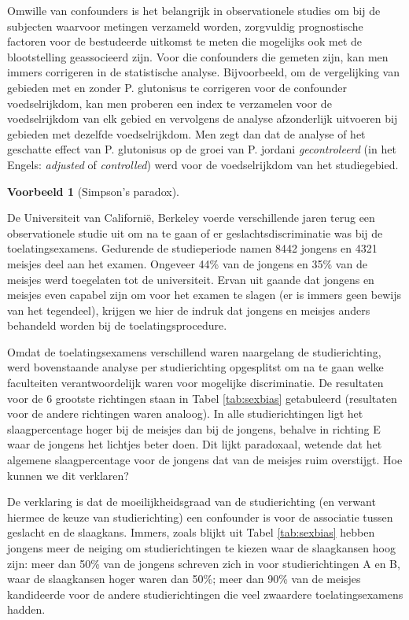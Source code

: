 \documentclass[
  12pt,dutch,coursenotes]{book}
\theoremstyle{definition}
\theoremstyle{definition}
\newtheorem{example}{Voorbeeld}[chapter]
\theoremstyle{definition}
\theoremstyle{remark}
\begin{document}
Omwille van confounders is het belangrijk in observationele studies om bij
de subjecten waarvoor metingen verzameld worden, zorgvuldig prognostische factoren voor de bestudeerde uitkomst te meten die mogelijks ook met de blootstelling geassocieerd zijn.
Voor die confounders die gemeten zijn, kan men immers corrigeren in de
statistische analyse. Bijvoorbeeld, om de vergelijking van gebieden met en
zonder P. glutonisus te corrigeren voor de confounder voedselrijkdom, kan men proberen een index te verzamelen voor de voedselrijkdom van elk gebied en vervolgens de analyse
afzonderlijk uitvoeren bij gebieden met dezelfde voedselrijkdom.
Men zegt dan dat de analyse of het geschatte
effect van P. glutonisus op de groei van P. jordani \emph{gecontroleerd} (in het Engels:
\emph{adjusted} of \emph{controlled}) werd voor de voedselrijkdom van het studiegebied.

\begin{example}[Simpson's paradox]
\protect\hypertarget{exm:unnamed-chunk-82}{}{\label{exm:unnamed-chunk-82} \iffalse (Simpson's paradox) \fi{} }
\end{example}

De Universiteit van
Californië, Berkeley voerde verschillende jaren terug een observationele
studie uit om na te gaan of er geslachtsdiscriminatie was bij de
toelatingsexamens. Gedurende de studieperiode namen 8442 jongens en 4321
meisjes deel aan het examen. Ongeveer 44\% van de jongens en 35\% van de
meisjes werd toegelaten tot de universiteit. Ervan uit gaande dat jongens en
meisjes even capabel zijn om voor het examen te slagen (er is immers geen
bewijs van het tegendeel), krijgen we hier de indruk dat jongens en meisjes
anders behandeld worden bij de toelatingsprocedure.

Omdat de toelatingsexamens verschillend waren naargelang de studierichting,
werd bovenstaande analyse per studierichting opgesplitst om na te gaan welke
faculteiten verantwoordelijk waren voor mogelijke discriminatie. De
resultaten voor de 6 grootste richtingen staan in Tabel \ref{tab:sexbias}
getabuleerd (resultaten voor de andere richtingen waren analoog). In alle
studierichtingen ligt het slaagpercentage hoger bij de meisjes dan bij de
jongens, behalve in richting E waar de jongens het lichtjes beter doen. Dit
lijkt paradoxaal, wetende dat het algemene slaagpercentage voor de jongens
dat van de meisjes ruim overstijgt. Hoe kunnen we dit verklaren?

De verklaring is dat de moeilijkheidsgraad van de studierichting (en verwant
hiermee de keuze van studierichting) een confounder is voor de associatie
tussen geslacht en de slaagkans. Immers, zoals blijkt uit Tabel \ref{tab:sexbias} hebben jongens meer de neiging om studierichtingen te kiezen
waar de slaagkansen hoog zijn: meer dan 50\% van de jongens schreven zich in
voor studierichtingen A en B, waar de slaagkansen hoger waren dan 50\%; meer
dan 90\% van de meisjes kandideerde voor de andere studierichtingen die veel
zwaardere toelatingsexamens hadden.
\end{document}
